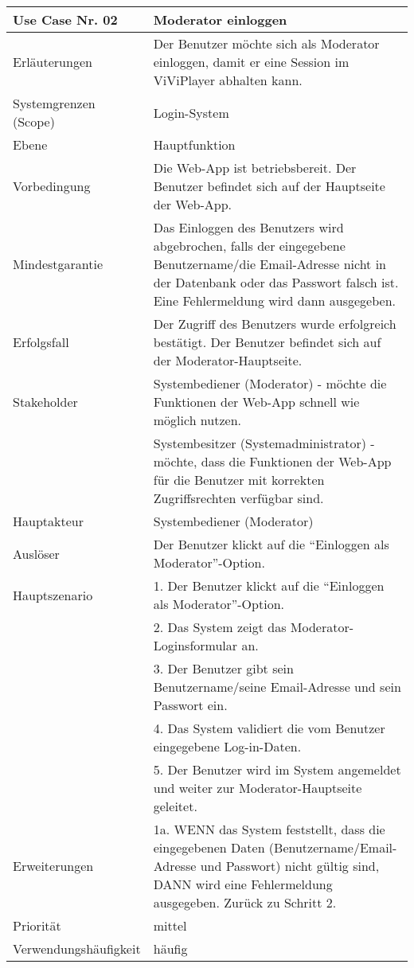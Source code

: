 \begin{tabularx}{\linewidth}{|l|X|}
	\hline
	Use Case Nr. 02			& \textbf{Moderator einloggen} \\ \hline
	Erläuterungen			& Der Benutzer möchte sich als Moderator einloggen, damit er eine 
							  Session im ViViPlayer abhalten kann. \\ \hline
	Systemgrenzen (Scope)	& Login-System \\ \hline
	Ebene					& Hauptfunktion \\ \hline
	Vorbedingung			& Die Web-App ist betriebsbereit. Der Benutzer befindet sich auf der
							  Hauptseite der Web-App. \\ \hline
	Mindestgarantie			& Das Einloggen des Benutzers wird abgebrochen, falls der eingegebene
							  Benutzername/die Email-Adresse nicht in der Datenbank oder das Passwort falsch ist. Eine Fehlermeldung wird dann ausgegeben.
							  \\ \hline
	Erfolgsfall 			& Der Zugriff des Benutzers wurde erfolgreich bestätigt. Der
							  Benutzer befindet sich auf der Moderator-Hauptseite. 
							  \\ \hline
	Stakeholder				& Systembediener (Moderator) - möchte die Funktionen der Web-App 
							  schnell wie möglich nutzen. \\
							& Systembesitzer (Systemadministrator) - möchte, dass die Funktionen 
							  der Web-App für die Benutzer mit korrekten Zugriffsrechten verfügbar sind.\\ \hline
	Hauptakteur				& Systembediener (Moderator) \\ \hline
	Auslöser				& Der Benutzer klickt auf die ``Einloggen als Moderator''-Option.\\ 
							  \hline	
	Hauptszenario			& 1. Der Benutzer klickt auf die ``Einloggen als 
							  Moderator''-Option.\\
							& 2. Das System zeigt das Moderator-Loginsformular an. \\
							& 3. Der Benutzer gibt sein Benutzername/seine Email-Adresse und 
							  sein Passwort ein. \\
							& 4. Das System validiert die vom Benutzer eingegebene
							  Log-in-Daten. \\
							& 5. Der Benutzer wird im System angemeldet und weiter zur
							  Moderator-Hauptseite geleitet. \\ \hline
	Erweiterungen			& 1a. WENN das System feststellt, dass die eingegebenen Daten
							  (Benutzername/Email-Adresse und Passwort) nicht gültig sind, DANN wird eine Fehlermeldung ausgegeben. Zurück zu Schritt 2. \\ \hline
	Priorität				& mittel \\ \hline
	Verwendungshäufigkeit	& häufig \\ \hline
\end{tabularx}
